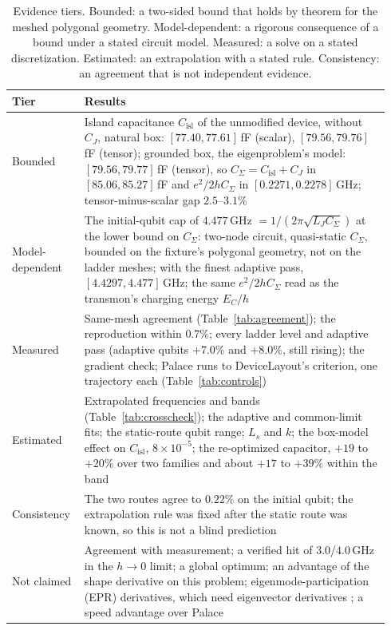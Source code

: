 \documentclass{anvil-paper}
\newcommand{\Cisl}{C_{\mathrm{isl}}}
\begin{document}
\begin{table}[htbp]
  \centering
  \caption{Evidence tiers. Bounded: a two-sided bound that holds by theorem
  for the meshed polygonal geometry. Model-dependent: a rigorous consequence of a
  bound under a stated circuit model. Measured: a solve on a stated
  discretization. Estimated: an extrapolation with a stated rule.
  Consistency: an agreement that is not independent evidence.}
  \label{tab:tiers}
  \footnotesize
  \begin{tabular}{@{}>{\raggedright\arraybackslash}p{0.17\linewidth}>{\raggedright\arraybackslash}p{0.77\linewidth}@{}}
    \toprule
    Tier & Results \\
    \midrule
    Bounded & Island capacitance $\Cisl$ of the unmodified device, without $C_J$, natural box: $[77.40, 77.61]$\,fF (scalar), $[79.56, 79.76]$\,fF (tensor); grounded box, the eigenproblem's model: $[79.56, 79.77]$\,fF (tensor), so $C_\Sigma = \Cisl + C_J$ in $[85.06, 85.27]$\,fF and $e^2/2hC_\Sigma$ in $[0.2271, 0.2278]$\,GHz; tensor-minus-scalar gap $2.5$--$3.1\%$ \\
    Model-dependent & The initial-qubit cap of $4.477$\,GHz $= 1/(2\pi\sqrt{L_J C_\Sigma})$ at the lower bound on $C_\Sigma$: two-node circuit, quasi-static $C_\Sigma$, bounded on the fixture's polygonal geometry, not on the ladder meshes; with the finest adaptive pass, $[4.4297, 4.477]$\,GHz; the same $e^2/2hC_\Sigma$ read as the transmon's charging energy $E_C/h$ \\
    Measured & Same-mesh agreement (Table~\ref{tab:agreement}); the reproduction within $0.7\%$; every ladder level and adaptive pass (adaptive qubits $+7.0\%$ and $+8.0\%$, still rising); the gradient check; Palace runs to DeviceLayout's criterion, one trajectory each (Table~\ref{tab:controls}) \\
    Estimated & Extrapolated frequencies and bands (Table~\ref{tab:crosscheck}); the adaptive and common-limit fits; the static-route qubit range; $L_s$ and $k$; the box-model effect on $\Cisl$, $8\times10^{-5}$; the re-optimized capacitor, $+19$ to $+20\%$ over two families and about $+17$ to $+39\%$ within the band \\
    Consistency & The two routes agree to $0.22\%$ on the initial qubit; the extrapolation rule was fixed after the static route was known, so this is not a blind prediction \\
    Not claimed & Agreement with measurement; a verified hit of $3.0$/$4.0$\,GHz in the $h \to 0$ limit; a global optimum; an advantage of the shape derivative on this problem; eigenmode-participation (EPR) derivatives, which need eigenvector derivatives \citep{nelson1976simplified}; a speed advantage over Palace \\
    \bottomrule
  \end{tabular}
\end{table}
\end{document}
